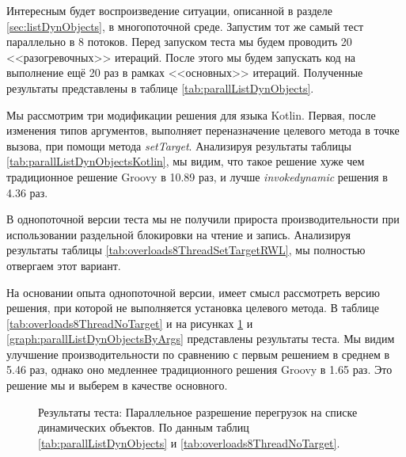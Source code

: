 Интересным будет воспроизведение ситуации, описанной в разделе \ref{sec:listDynObjects}, в многопоточной среде. Запустим тот же самый тест параллельно в 8 потоков. Перед запуском теста мы будем проводить 20 <<разогревочных>> итераций. После этого мы будем запускать код на выполнение ещё 20 раз в рамках <<основных>> итераций. Полученные результаты представлены в таблице \ref{tab:parallListDynObjects}. 


Мы рассмотрим три модификации решения для языка Kotlin. Первая, после изменения типов аргументов, выполняет переназначение целевого метода в точке вызова, при помощи метода \textit{setTarget}. Анализируя результаты таблицы \ref{tab:parallListDynObjectsKotlin}, мы видим, что такое решение хуже чем традиционное решение Groovy в 10.89 раз, и лучше \textit{invokedynamic} решения в 4.36 раз.

В однопоточной версии теста мы не получили прироста производительности при использовании раздельной блокировки на чтение и запись. Анализируя результаты таблицы \ref{tab:overloads8ThreadSetTargetRWL}, мы полностью отвергаем этот вариант.

На основании опыта однопоточной версии, имеет смысл рассмотреть версию решения, при которой не выполняется установка целевого метода. В таблице \ref{tab:overloads8ThreadNoTarget} и на рисунках \ref{graph:parallListDynObjects} и \ref{graph:parallListDynObjectsByArgs} представлены результаты теста. Мы видим улучшение производительности по сравнению с первым решением в среднем в 5.46 раз, однако оно медленнее традиционного решения Groovy в 1.65 раз. Это решение мы и выберем в качестве основного.

\begin{figure}
\caption{\label{graph:parallListDynObjects}Результаты теста: Параллельное разрешение перегрузок на списке динамических объектов. По данным таблиц \ref{tab:parallListDynObjects} и \ref{tab:overloads8ThreadNoTarget}.}
\end{figure}





